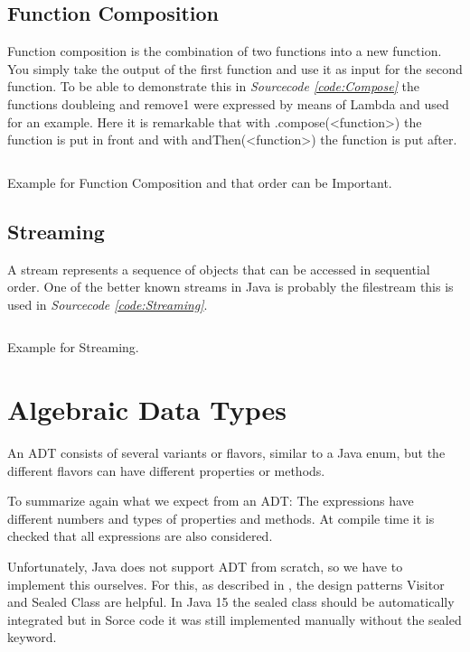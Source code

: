 \documentclass[a4paper,12pt,twoside]{scrreprt}
\begin{document}
\subsection{Function Composition}
Function composition is the combination of two functions into a new function. You simply take the output of the first function and use it as input for the second function. To be able to demonstrate this in \emph{Sourcecode \ref{code:Compose}} the functions doubleing and remove1 were expressed by means of Lambda and used for an example. Here it is remarkable that with .compose(<function>) the function is put in front and with andThen(<function>) the function is put after.
\begin{listing}[ht]
    \inputminted[fontsize=\footnotesize,linenos,breaklines]{java}{./code/FunctionComposition.java}
    \caption[Example for Function Composition]{Example for Function Composition and that order can be Important.}
    \label{code:Compose}
\end{listing}
\clearpage

\subsection{Streaming}
A stream represents a sequence of objects that can be accessed in sequential order.
One of the better known streams in Java is probably the filestream this is used in \emph{Sourcecode \ref{code:Streaming}}.
\begin{listing}[ht]
    \inputminted[fontsize=\footnotesize,linenos]{java}{./code/Streaming.java}
    \caption[Example for Streaming]{Example for Streaming.}
    \label{code:Streaming}
\end{listing}
\clearpage
\section{Algebraic Data Types}
An \ac{ADT} consists of several variants or flavors, similar to a Java enum, but the different flavors can have different properties or methods.

To summarize again what we expect from an \ac{ADT}:
The expressions have different numbers and types of properties and methods.
At compile time it is checked that all expressions are also considered.

Unfortunately, Java does not support ADT from scratch, so we have to implement this ourselves. For this, as described in \cite{MAINIERO_algebraic_2020}, the design patterns Visitor and Sealed Class are helpful. In Java 15 the sealed class should be automatically integrated but in Sorce code it was still implemented manually without the sealed keyword.
\end{document}
